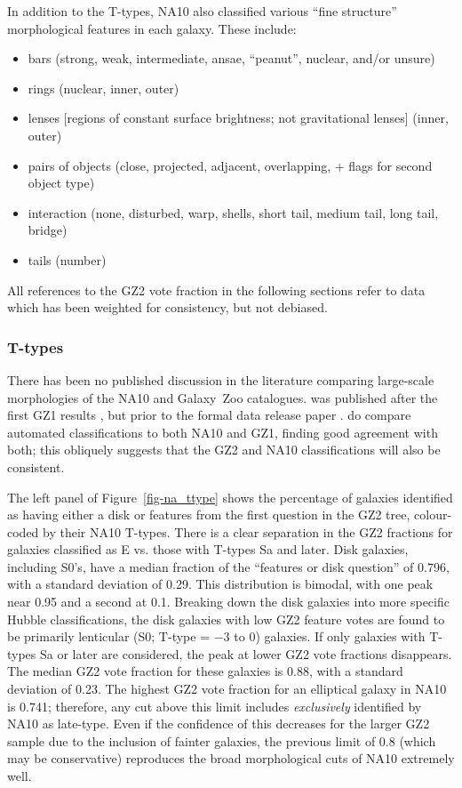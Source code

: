 \documentclass[useAMS,usenatbib]{mn2e}
\begin{document}
In addition to the T-types, NA10 also classified various ``fine structure'' morphological features in each galaxy. These include:

\begin{itemize}
	\item bars (strong, weak, intermediate, ansae, ``peanut'', nuclear, and/or unsure)
	\item rings (nuclear, inner, outer)
	\item lenses [regions of constant surface brightness; not gravitational lenses] (inner, outer)
	\item pairs of objects (close, projected, adjacent, overlapping, + flags for second object type)
	\item interaction (none, disturbed, warp, shells, short tail, medium tail, long tail, bridge)
	\item tails (number)
\end{itemize}

All references to the GZ2 vote fraction in the following sections refer to data which has been weighted for consistency, but not debiased. 

\subsubsection{T-types}

There has been no published discussion in the literature comparing large-scale morphologies of the NA10 and Galaxy~Zoo catalogues. \citet{nai10} was published after the first GZ1 results \citep{lin08}, but prior to the formal data release paper \citep{lin11}. \citet{hue11} do compare automated classifications to both NA10 and GZ1, finding good agreement with both; this obliquely suggests that the GZ2 and NA10 classifications will also be consistent. 

The left panel of Figure~\ref{fig-na_ttype} shows the percentage of galaxies identified as having either a disk or features from the first question in the GZ2 tree, colour-coded by their NA10 T-types. There is a clear separation in the GZ2 fractions for galaxies classified as E vs. those with T-types Sa and later. Disk galaxies, including S0's, have a median fraction of the ``features or disk question'' of 0.796, with a standard deviation of 0.29. This distribution is bimodal, with one peak near 0.95 and a second at 0.1. Breaking down the disk galaxies into more specific Hubble classifications, the disk galaxies with low GZ2 feature votes are found to be primarily lenticular (S0; T-type = $-3$ to 0) galaxies. If only galaxies with T-types Sa or later are considered, the peak at lower GZ2 vote fractions disappears. The median GZ2 vote fraction for these galaxies is 0.88, with a standard deviation of 0.23. The highest GZ2 vote fraction for an elliptical galaxy in NA10 is 0.741; therefore, any cut above this limit includes {\it exclusively} identified by NA10 as late-type. Even if the confidence of this decreases for the larger GZ2 sample due to the inclusion of fainter galaxies, the previous limit of 0.8 (which may be conservative) reproduces the broad morphological cuts of NA10 extremely well. 
\end{document}
